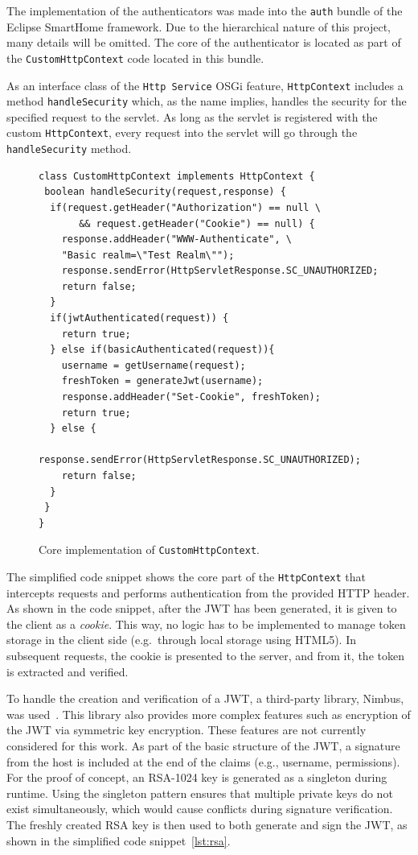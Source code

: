 \documentclass[12pt]{article}
\newcommand{\TODO}{\todo[inline]}
\begin{document}
The implementation of the authenticators was made into the \texttt{auth} bundle of the Eclipse SmartHome framework. Due to the hierarchical nature of this project, many details will be omitted. The core of the authenticator is located as part of the \texttt{CustomHttpContext} code located in this bundle.

As an interface class of the \texttt{Http Service} OSGi feature, \texttt{HttpContext} includes a method \texttt{handleSecurity} which, as the name implies, handles the security for the specified request to the servlet. As long as the servlet is registered with the custom \texttt{HttpContext}, every request into the servlet will go through the \texttt{handleSecurity} method.

\TODO{FIX HYPHEN ISSUES AND REF TO CODE SNIPPET INSTEAD OF FIG}
\begin{figure} [htb]
  \begin{lstlisting}
class CustomHttpContext implements HttpContext {   
 boolean handleSecurity(request,response) {
  if(request.getHeader("Authorization") == null \
       && request.getHeader("Cookie") == null) {
    response.addHeader("WWW-Authenticate", \
	"Basic realm=\"Test Realm\"");
    response.sendError(HttpServletResponse.SC_UNAUTHORIZED;
    return false;
  }	    
  if(jwtAuthenticated(request)) {
    return true;		
  } else if(basicAuthenticated(request)){
    username = getUsername(request);
    freshToken = generateJwt(username);
    response.addHeader("Set-Cookie", freshToken);
    return true;
  } else {
    response.sendError(HttpServletResponse.SC_UNAUTHORIZED);
    return false;
  }
 }
}
\end{lstlisting}
\caption{Core implementation of \texttt{CustomHttpContext}.}
\label{lst:core_impl}
\end{figure}

The simplified code snippet shows the core part of the \texttt{HttpContext} that intercepts requests and performs authentication from the provided HTTP header. As shown in the code snippet, after the JWT has been generated, it is given to the client as a \emph{cookie}. This way, no logic has to be implemented to manage token storage in the client side (e.g.\ through local storage using HTML5). In subsequent requests, the cookie is presented to the server, and from it, the token is extracted and verified.

To handle the creation and verification of a JWT, a third-party library, Nimbus, was used~\cite{nimbus}. This library also provides more complex features such as encryption of the JWT via symmetric key encryption. These features are not currently considered for this work. As part of the basic structure of the JWT, a signature from the host is included at the end of the claims (e.g., username, permissions). For the proof of concept, an RSA-1024 key is generated as a singleton during runtime. Using the singleton pattern ensures that multiple private keys do not exist simultaneously, which would cause conflicts during signature verification. The freshly created RSA key is then used to both generate and sign the JWT, as shown in the simplified code snippet~\ref{lst:rsa}.
\end{document}
